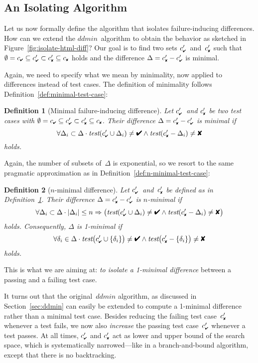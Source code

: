 \documentclass{acm_proc_article-sp}
\newcommand{\PASS}{\text{\ding{52}}\xspace}
\newcommand{\FAIL}{\text{\ding{56}}\xspace}
\newcommand{\cpass}{{c_{\scriptscriptstyle \PASS}}}
\newcommand{\cfail}{{c_{\scriptscriptstyle \FAIL}}}
\newcommand{\dpass}{{c'_{\scriptscriptstyle \PASS}}}
\newcommand{\dfail}{{c'_{\scriptscriptstyle \FAIL}}}
\newcommand{\test}{\textit{test}\xspace}
\newcommand{\ddmin}{\textit{ddmin}\xspace}
\theoremstyle{plain}
\newtheorem{definition}{Definition}
\begin{document}
\subsection{An Isolating Algorithm}
\label{sec:dd}

Let us now formally define the algorithm that isolates
failure-inducing differences.  How can we extend the
$\ddmin$~algorithm to obtain the behavior as sketched in
Figure~\ref{fig:isolate-html-diff}?  Our goal is to find two sets
$\dpass$~and~$\dfail$ such that $\emptyset = \cpass \subseteq \dpass \subset \dfail \subseteq
\cfail$ holds and the difference $\Delta = \dfail - \dpass$ is minimal.

Again, we need to specify what we mean by minimality, now applied to
differences instead of test cases.  The definition of minimality
follows Definition~\ref{def:minimal-test-case}:

\begin{definition}[Minimal failure-inducing difference]
\label{def:minimal-difference}
Let $\dpass$~and $\dfail$ be two test cases with $\emptyset = \cpass \subseteq \dpass
\subset \dfail \subseteq \cfail$.
Their difference $\Delta = \dfail - \dpass$ is \emph{minimal} if
$$
  \forall \Delta_i \subset \Delta \cdot \test(\dpass \cup \Delta_i) \neq \PASS \land \test(\dfail - \Delta_i) \neq \FAIL
$$
holds.
\end{definition}

Again, the number of subsets of~$\Delta$ is exponential, so we resort to
the same pragmatic approximation as in
Definition~\ref{def:n-minimal-test-case}:

\begin{definition}[$n$-minimal difference]
\label{def:n-minimal-difference}
Let $\dpass$~and~$\dfail$ be defined as in
Definition~\ref{def:minimal-difference}.  
Their difference $\Delta = \dfail - \dpass$ is \emph{$n$-minimal} if
$$
\forall \Delta_i \subset \Delta \cdot |\Delta_i| \leq n \Rightarrow \bigl(\test(\dpass \cup \Delta_i) \neq \PASS \land 
                             \test(\dfail - \Delta_i) \neq \FAIL\bigr)
$$
holds.  Consequently, $\Delta$ is \emph{1-minimal} if
$$
\forall \delta_i \in \Delta \cdot \test\bigl(\dpass \cup \{\delta_i\}\bigr) \neq \PASS \land \test\bigl(\dfail - \{\delta_i\}\bigr) \neq \FAIL
$$
holds.
\end{definition}

This is what we are aiming at: \emph{to isolate a 1-minimal
  difference} between a passing and a failing test case.

It turns out that the original~$\ddmin$ algorithm, as discussed in
Section~\ref{sec:ddmin} can easily be extended to compute a 1-minimal
difference rather than a minimal test case.  Besides reducing the
failing test case~$\dfail$ whenever a test fails, we now also
\emph{increase} the passing test case~$\dpass$ whenever a test passes.
At all times, $\dpass$ and $\dfail$ act as lower and upper bound of
the search space, which is systematically narrowed---like in a
branch-and-bound algorithm, except that there is no backtracking.
\end{document}
